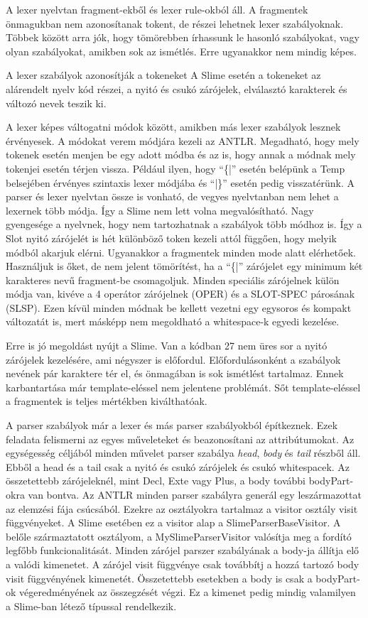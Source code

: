 {A lexer nyelvtan fragment-ekből és lexer rule-okból áll. 
A fragmentek önmagukban nem azonosítanak tokent, de részei lehetnek lexer szabályoknak. 
Többek között arra jók, hogy tömörebben írhassunk le hasonló szabályokat, vagy olyan szabályokat, amikben sok az ismétlés. 
Erre ugyanakkor nem mindig képes.

A lexer szabályok azonosítják a tokeneket
A Slime esetén a tokeneket az alárendelt nyelv kód részei, a nyitó és csukó zárójelek, elválasztó karakterek és változó nevek teszik ki.

A lexer képes váltogatni módok között, amikben más lexer szabályok lesznek érvényesek. 
A módokat verem módjára kezeli az ANTLR. 
Megadható, hogy mely tokenek esetén menjen be egy adott módba és az is, hogy annak a módnak mely tokenjei esetén térjen vissza. 
Például ilyen, hogy “\{|” esetén belépünk a Temp belsejében érvényes szintaxis lexer módjába és “|\}” esetén pedig visszatérünk. 
A parser és lexer nyelvtan össze is vonható, de vegyes nyelvtanban nem lehet a lexernek több módja.
Így a Slime nem lett volna megvalósítható.
Nagy gyengesége a nyelvnek, hogy nem tartozhatnak a szabályok több módhoz is. 
Így a Slot nyitó zárójelét is hét különböző token kezeli attól függően, hogy melyik módból akarjuk elérni. 
Ugyanakkor a fragmentek  minden mode alatt elérhetőek. 
Használjuk is őket, de nem jelent tömörítést, ha a “\{|” zárójelet egy minimum két karakteres nevű fragment-be csomagoljuk.
Minden speciális zárójelnek külön módja van, kivéve a 4 operátor zárójelnek (OPER) és a SLOT-SPEC párosának (SLSP). 
Ezen kívül minden módnak be kellett vezetni egy egysoros és kompakt változatát is, mert másképp nem megoldható a whitespace-k egyedi kezelése.

Erre is jó megoldást nyújt a Slime. 
Van a kódban 27 nem üres sor a nyitó zárójelek kezelésére, ami négyszer is előfordul.
Előfordulásonként a szabályok nevének pár karaktere tér el, és önmagában is sok ismétlést tartalmaz. 
Ennek karbantartása már template-eléssel nem jelentene problémát. 
Sőt template-eléssel a fragmentek is teljes mértékben kiválthatóak.

A parser szabályok már a lexer és más parser szabályokból építkeznek. 
Ezek feladata felismerni az egyes műveleteket és beazonosítani az attribútumokat. 
Az egységesség céljából minden művelet parser szabálya \textit{head}, \textit{body} és \textit{tail} részből áll.
Ebből a head és a tail csak a nyitó és csukó zárójelek és csukó whitespacek. 
Az összetettebb zárójeleknél, mint Decl, Exte vagy Plus, a body további bodyPart-okra van bontva. 
Az ANTLR minden parser szabályra generál egy leszármazottat az elemzési fája csúcsából. 
Ezekre az osztályokra tartalmaz a visitor osztály visit függvényeket. 
A Slime esetében ez a visitor alap a SlimeParserBaseVisitor.
A belőle származtatott osztályom, a MySlimeParserVisitor valósítja meg a fordító legfőbb funkcionalitását. 
Minden zárójel parszer szabályának a body-ja állítja elő a valódi kimenetet.
A zárójel visit függvénye csak továbbítj a hozzá tartozó body visit függvényének kimenetét. 
Összetettebb esetekben a body is csak a bodyPart-ok végeredményének az összegzését végzi. 
Ez a kimenet pedig mindig valamilyen a Slime-ban létező típussal rendelkezik.

}
